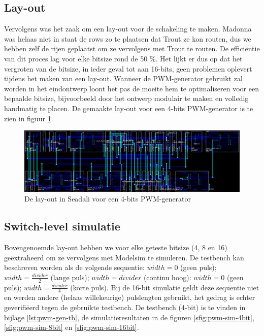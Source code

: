 \documentclass{article}
\begin{document}
\subsection{Lay-out}
\label{ssec:pwm-impl-layout}
Vervolgens was het zaak om een lay-out voor de schakeling te maken. Madonna was helaas niet in staat de rows zo te plaatsen dat Trout ze kon routen, dus we hebben zelf de rijen geplaatst om ze vervolgens met Trout te routen. De efficiëntie van dit proces lag voor elke bitsize rond de 50 \%. Het lijkt er dus op dat het vergroten van de bitsize, in ieder geval tot aan 16-bits, geen problemen oplevert tijdens het maken van een lay-out. Wanneer de PWM-generator gebruikt zal worden in het eindontwerp loont het pas de moeite hem te optimaliseren voor een bepaalde bitsize, bijvoorbeeld door het ontwerp modulair te maken en volledig handmatig te placen.
De gemaakte lay-out voor een 4-bits PWM-generator is te zien in figuur \ref{fig:pwm-layout}.

\begin{figure}[H]
	\centering
	\includegraphics[width=\textwidth]{resource/pwm_gen_layout.png}
	\caption{De lay-out in Seadali voor een 4-bits PWM-generator}
	\label{fig:pwm-layout}
\end{figure}

\subsection{Switch-level simulatie}
\label{ssec:pwm-impl-switch}
Bovengenoemde lay-out hebben we voor elke geteste bitsize (4, 8 en 16) geëxtraheerd om ze vervolgens met Modelsim te simuleren. De testbench kan beschreven worden als de volgende sequentie: $width = 0$ (geen puls); $width = \frac{divider}{2}$ (lange puls); $width = divider$ (continu hoog): $width = 0$ (geen puls); $width = \frac{divider}{4}$ (korte puls). Bij de 16-bit simulatie geldt deze sequentie niet en werden andere (helaas willekeurige) pulslengten gebruikt, het gedrag is echter geverifiëerd tegen de gebruikte testbench.
De testbench (4-bit) is te vinden in bijlage \ref{lst:pwm-gen-tb}, de simulatieresultaten in de figuren \ref{sfig:pwm-sim-4bit}, \ref{sfig:pwm-sim-8bit} en \ref{sfig:pwm-sim-16bit}.
\end{document}
